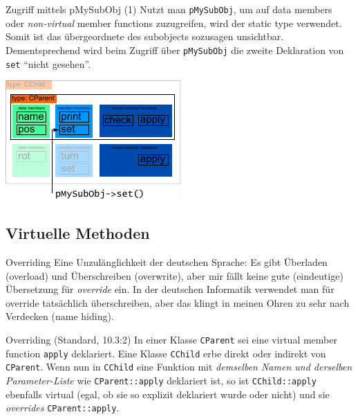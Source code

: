 \begin{frame}[fragile,b]{Zugriff mittels pMySubObj (1)}
	Nutzt man \verb|pMySubObj|, um auf data members oder \emph{non-virtual} member functions zuzugreifen, wird der static type verwendet. Somit ist das übergeordnete des subobjects sozusagen unsichtbar. Dementsprechend wird beim Zugriff über \verb|pMySubObj| die zweite Deklaration von \verb|set| \enquote{nicht gesehen}.
	
	\vspace{2em}
	
	\includegraphics[width=0.5\linewidth]{images/pMySubObj-set}
\end{frame}


\subsection{Virtuelle Methoden}

\begin{frame}[fragile]{Overriding}
	\tiny
	Eine Unzulänglichkeit der deutschen Sprache: Es gibt Überladen (overload) und Überschreiben (overwrite), aber mir fällt keine gute (eindeutige) Übersetzung für \emph{override} ein. In der deutschen Informatik verwendet man für override tatsächlich überschreiben, aber das klingt in meinen Ohren zu sehr nach Verdecken (name hiding).
	
	\normalsize
	\vspace{0.5em}
	
	\begin{block}{Overriding (Standard, 10.3:2)}
		In einer Klasse \verb|CParent| sei eine virtual member function \verb|apply| deklariert. Eine Klasse \verb|CChild| erbe direkt oder indirekt von \verb|CParent|. Wenn nun in \verb|CChild| eine Funktion mit \emph{demselben Namen und derselben Parameter-Liste} wie \verb|CParent::apply| deklariert ist, so ist \verb|CChild::apply| ebenfalls virtual (egal, ob sie so explizit deklariert wurde oder nicht) und sie \emph{overrides} \verb|CParent::apply|.
	\end{block}
\end{frame}


